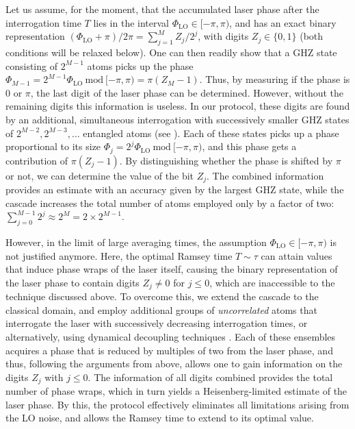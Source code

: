 Let us assume, for the moment, that the accumulated laser phase after the
interrogation time $T$ lies in the interval $\Phi_\mathrm{LO}\in[-\pi,\pi)$, and
has an exact binary representation $(\Phi_\mathrm{LO}+\pi)/2\pi= \sum_{j=1}^M Z_j/
2^{j}$, with digits $Z_j\in \{0,1\}$ (both conditions will be relaxed below).
One can then readily show that a GHZ state consisting of $2^{M-1}$ atoms picks
up the phase $\Phi_{M-1} = 2^{M-1} \Phi_\mathrm{LO}  ~\mathrm{mod}~ [-\pi,\pi) = \pi
(Z_M-1)$. Thus, by measuring if the phase is $0$ or $\pi$, the last digit of the
laser phase can be determined. However, without
the remaining digits this information is
useless.
In our protocol, these digits are found by an additional, simultaneous
interrogation with successively smaller GHZ states of $2^{M-2},2^{M-3},\hdots$
entangled atoms (see ). Each of these states
picks up a phase proportional to its size  $\Phi_{j} = 2^{j}
\Phi_\mathrm{LO}~\mathrm{mod}~ [-\pi,\pi)$, and this
phase gets a contribution of $\pi (Z_j-1)$.
By distinguishing whether the phase is shifted by $\pi$ or not, we can 
determine the value of the bit $Z_j$.
The combined information provides an estimate with an accuracy given by the
largest GHZ state, while the cascade increases the total number of atoms
employed only by a factor of two: $\sum_{j=0}^{M-1} 2^j \approx
2^{M}=2\times2^{M-1}$.

However, in the limit of large averaging times, the assumption
$\Phi_\mathrm{LO}\in [-\pi,\pi)$ is not justified anymore. Here, the optimal
Ramsey time $T\sim\tau$ can attain values that induce phase wraps of the laser
itself, causing the binary representation of the laser phase to contain digits
$Z_j\neq0$ for $j\leq0$, which are inaccessible to the technique discussed
above.
To overcome this, we extend the cascade to
the classical domain, and employ additional groups of {\it uncorrelated}
atoms that interrogate the laser with successively decreasing interrogation times, or
alternatively, using dynamical decoupling techniques \cite{Rosenband2013,
Borregaard2013,ddc}. Each of these ensembles acquires a phase that is
reduced by multiples of two from the laser phase, and thus, following the
arguments from above, allows one to gain information on the digits
$Z_j$ with $j\leq0$.
The information of all digits combined provides the total number of phase wraps,
which in turn yields a Heisenberg-limited estimate of the laser phase.
By this, the protocol effectively eliminates all limitations
arising from the LO noise, and allows the Ramsey time to extend to its optimal
value.

